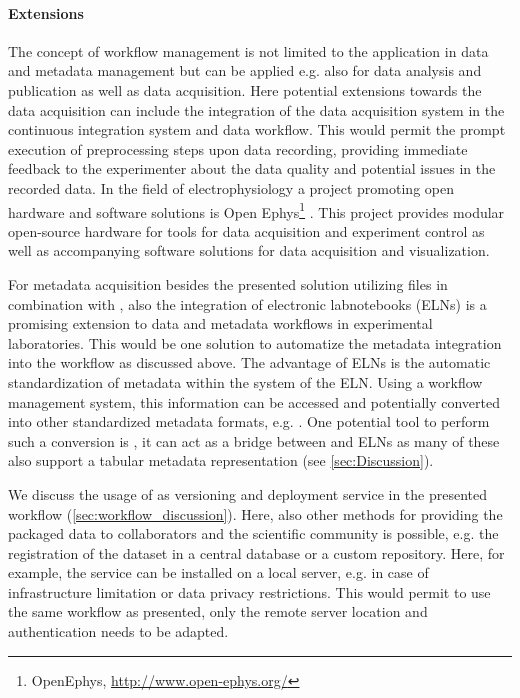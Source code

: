 \paragraph{Extensions}
The concept of workflow management is not limited to the application in data and metadata management but can be applied e.g. also for data analysis and publication as well as data acquisition.
Here potential extensions towards the data acquisition can include the integration of the data acquisition system in the continuous integration system and data workflow. This would permit the prompt execution of preprocessing steps upon data recording, providing immediate feedback to the experimenter about the data quality and potential issues in the recorded data. In the field of electrophysiology a project promoting open hardware and software solutions is Open Ephys\footnote{OpenEphys, \url{http://www.open-ephys.org/}} \citep{Siegle_2017}. This project provides modular open-source hardware for tools for data acquisition and experiment control as well as accompanying software solutions for data acquisition and visualization.

For metadata acquisition besides the presented solution utilizing  files in combination with , also the integration of electronic labnotebooks (ELNs) is a promising extension to data and metadata workflows in experimental laboratories. This would be one solution to automatize the metadata integration into the workflow as discussed above. The advantage of ELNs is the automatic standardization of metadata within the system of the ELN. Using a workflow management system, this information can be accessed and potentially converted into other standardized metadata formats, e.g. . One potential tool to perform such a conversion is , it can act as a bridge between  and ELNs as many of these also support a tabular metadata representation (see \cref{sec:Discussion}).

We discuss the usage of  as versioning and deployment service in the presented workflow (\ref{sec:workflow_discussion}). Here, also other methods for providing the packaged data to collaborators and the scientific community is possible, e.g. the registration of the dataset in a central database or a custom repository. Here, for example, the  service can be installed on a local server, e.g. in case of infrastructure limitation or data privacy restrictions. This would permit to use the same workflow as presented, only the remote server location and authentication needs to be adapted. 

